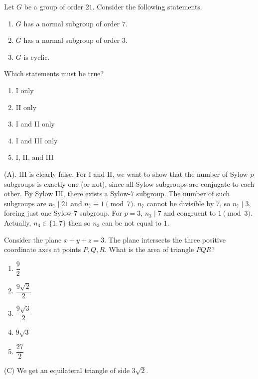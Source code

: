 \begin{exercise}
Let $G$ be a group of order $21$. Consider the following statements.
\begin{enumerate}[label=\Roman*.]
    \item $G$ has a normal subgroup
    of order $7$.

    \item $G$ has a normal subgroup
    of order $3$.

    \item $G$ is cyclic.
\end{enumerate}
Which statements must be true?
\begin{enumerate}[label=(\Alph*)]
    \item I only
    \item II only
    \item I and II only
    \item I and III only
    \item I, II, and III
\end{enumerate}
\end{exercise}
\begin{solution}
(A). III is clearly false. For I and II, we want to show that the number of Sylow-$p$
subgroups is exactly one (or not), since all Sylow subgroups are conjugate to each other.
By Sylow III, there exists a Sylow-$7$ subgroup.
The number of such subgroups are $n_7 \mid 21$ and $n_7 \equiv 1 \pmod{7}$.
$n_7$ cannot be divisible by $7$, so $n_7 \mid 3$, forcing just one 
Sylow-$7$ subgroup.
For $p = 3$, $n_3 \mid 7$ and congruent to $1 \pmod{3}$. Actually, $n_3 \in \{1,7\}$ then 
so $n_3$ can be not equal to $1$.
\end{solution}


\begin{exercise}
Consider the plane $x+y+z=3$.
The plane intersects the three positive coordinate axes at points $P,Q,R$.
What is the area of triangle $PQR$?
\begin{enumerate}[label=(\Alph*)]
    \item $\dfrac92$
    \item $\dfrac{9\sqrt2}{2}$
    \item $\dfrac{9\sqrt3}{2}$
    \item $9\sqrt3$
    \item $\dfrac{27}{2}$
\end{enumerate}
\end{exercise}
\begin{solution}
(C) We get an equilateral triangle of side $3\sqrt{2}$.
\end{solution}

